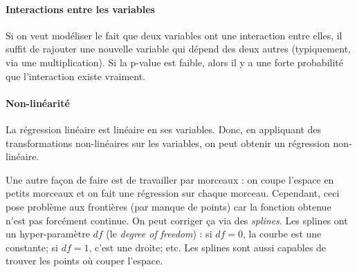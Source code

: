         \paragraph{Interactions entre les variables}
        Si on veut modéliser le fait que deux variables ont une interaction entre elles, il suffit de rajouter une nouvelle variable qui dépend des deux autres (typiquement, via une multiplication). Si la p-value est faible, alors il y a une forte probabilité que l'interaction existe vraiment.

        \paragraph{Non-linéarité}
        La régression linéaire est linéaire en ses variables. Donc, en appliquant des transformations non-linéaires sur les variables, on peut obtenir un régression non-linéaire.

        Une autre façon de faire est de travailler par morceaux : on coupe l'espace en petits morceaux et on fait une régression sur chaque morceau. Cependant, ceci pose problème aux frontières (par manque de points) car la fonction obtenue n'est pas forcément continue. On peut corriger ça via des \textit{splines}. Les splines ont un hyper-paramètre \(df\) (le \textit{degree of freedom}) : si \(df = 0\), la courbe est une constante; si \(df = 1\), c'est une droite; etc. Les splines sont aussi capables de trouver les points où couper l'espace.